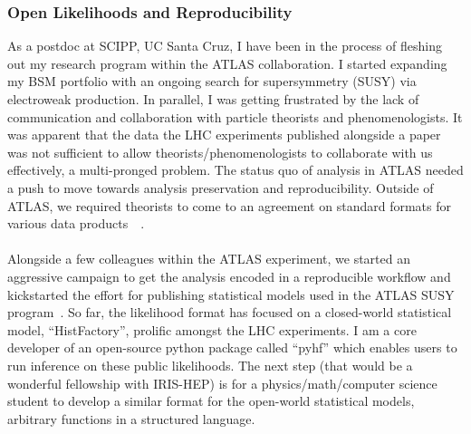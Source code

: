 \subsubsection{Open Likelihoods and Reproducibility} \label{sssec:open-likelihoods-and-reproducibility}
As a postdoc at SCIPP, UC Santa Cruz, I have been in the process of fleshing out my research program within the ATLAS collaboration. I started expanding my BSM portfolio with an ongoing search for supersymmetry (SUSY) via electroweak production. In parallel, I was getting frustrated by the lack of communication and collaboration with particle theorists and phenomenologists. It was apparent that the data the LHC experiments published alongside a paper was not sufficient to allow theorists/phenomenologists to collaborate with us effectively, a multi-pronged problem. The status quo of analysis in ATLAS needed a push to move towards analysis preservation and reproducibility. Outside of ATLAS, we required theorists to come to an agreement on standard formats for various data products~~. %
\\
\\
Alongside a few colleagues within the ATLAS experiment, we started an aggressive campaign to get the analysis encoded in a reproducible workflow and kickstarted the effort for publishing statistical models used in the ATLAS SUSY program~. %
So far, the likelihood format has focused on a closed-world statistical model, \enquote{HistFactory}, prolific amongst the LHC experiments. I am a core developer of an open-source python package called \enquote{pyhf} which enables users to run inference on these public likelihoods. The next step (that would be a wonderful fellowship with IRIS-HEP) is for a physics/math/computer science student to develop a similar format for the open-world statistical models, arbitrary functions in a structured language.

